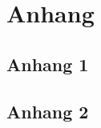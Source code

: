\chapter{Anhang} \label{app:anhang}

\section{Anhang 1} \label{app:anhang_1}

\section{Anhang 2} \label{app:anhang_2}